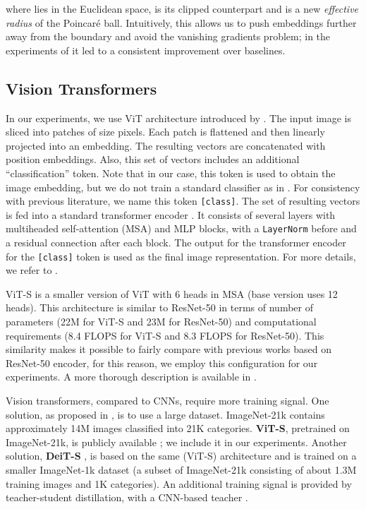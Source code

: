 \documentclass[10pt,twocolumn,letterpaper]{article}
\begin{document}
where  lies in the Euclidean space,  is its clipped counterpart and  is a new \emph{effective radius} of the Poincar\'e ball. Intuitively, this allows us to push embeddings further away from the boundary and avoid the vanishing gradients problem; in the experiments of \cite{guo2021free} it led to a consistent improvement over baselines.

\subsection{Vision Transformers}
\label{sec:vit}

In our experiments, we use ViT architecture introduced by \cite{vit}. The input image is sliced into patches of size  pixels. Each patch is flattened and then linearly projected into an embedding. The resulting vectors are concatenated with position embeddings. Also, this set of vectors includes an additional ``classification'' token. Note that in our case, this token is used to obtain the image embedding, but we do not train a standard classifier as in \cite{vit}. For consistency with previous literature, we name this token \texttt{[class]}. The set of resulting vectors is fed into a standard transformer encoder \cite{attention}. It consists of several layers with multiheaded self-attention (MSA) and MLP blocks, with a \texttt{LayerNorm} before and a residual connection after each block. The output for the transformer encoder for the \texttt{[class]} token is used as the final image representation. For more details, we refer to \cite{vit}.

ViT-S \cite{vit_pretrain} is a smaller version of ViT with 6 heads in MSA (base version uses 12 heads). This architecture is similar to ResNet-50 \cite{resnet} in terms of number of parameters (22M for ViT-S and 23M for ResNet-50) and computational requirements (8.4 FLOPS for ViT-S and 8.3 FLOPS for ResNet-50). This similarity makes it possible to fairly compare with previous works based on ResNet-50 encoder, for this reason, we employ this configuration for our experiments. A more thorough description is available in \cite{vit_pretrain}.

Vision transformers, compared to CNNs, require more training signal. One solution, as proposed in \cite{vit}, is to use a large dataset. ImageNet-21k \cite{imagenet} contains approximately 14M images classified into 21K categories. {\bf ViT-S}, pretrained on ImageNet-21k, is publicly available \cite{vit_pretrain}; we include it in our experiments. Another solution, {\bf DeiT-S} \cite{deit}, is based on the same (ViT-S) architecture and is trained on a smaller ImageNet-1k dataset \cite{imagenet1k} (a subset of ImageNet-21k consisting of about 1.3M training images and 1K categories). An additional training signal is provided by teacher-student distillation, with a CNN-based teacher \cite{deit}.
\end{document}

